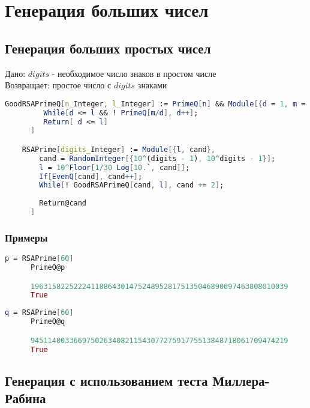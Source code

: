 
\chapter{Генерация больших чисел}

  \section{Генерация больших простых чисел}

    Дано: {$digits$} - необходимое число знаков в простом числе \\
    Возвращает: простое число с  {$digits$} знаками

    \begin{lstlisting}[language=Mathematica,caption={
      Генерация больших простых чисел
    }]
    GoodRSAPrimeQ[n_Integer, l_Integer] := PrimeQ[n] && Module[{d = 1, m = (n - 1)/2},
	     While[d <= l && ! PrimeQ[m/d], d++];
	     Return[ d <= l]
	  ]

    RSAPrime[digits_Integer] := Module[{l, cand},
        cand = RandomInteger[{10^(digits - 1), 10^digits - 1}];
        l = 10^Floor[1/30 Log[10.`, cand]];
        If[EvenQ[cand], cand++];
        While[! GoodRSAPrimeQ[cand, l], cand += 2];
        
        Return@cand
      ]

    \end{lstlisting}

    \subsection{Примеры}

      \begin{lstlisting}[language=Mathematica,caption={Пример 1}]
      p = RSAPrime[60]
      PrimeQ@p

      196315822522241188643014752489528175135046890697463808010039
      True
      \end{lstlisting}

      \begin{lstlisting}[language=Mathematica,caption={Пример 2}]
      q = RSAPrime[60]
      PrimeQ@q

      945114003366975026340821154307727591775513848718061709474219
      True
      \end{lstlisting}

  \section{Генерация с использованием теста Миллера-Рабина}

